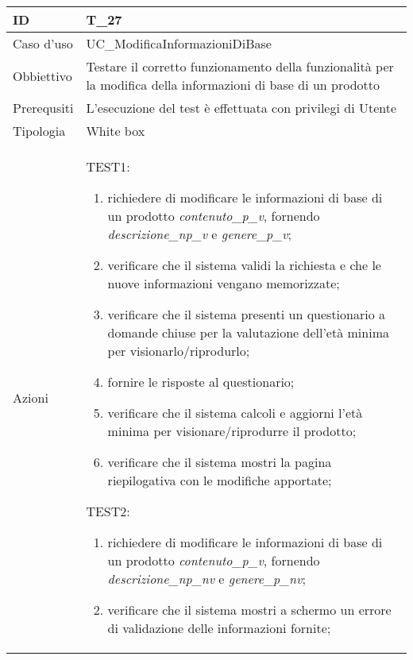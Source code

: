 \begin{table}[hb]
    \centering
    \begin{tabular}{ |p{2cm}|p{10cm}|  }
        \hline
        ID          & T\_27                                                                                                          \\\hline
        Caso d'uso  & UC\_ModificaInformazioniDiBase                                                                                 \\\hline
        Obbiettivo  & Testare il corretto funzionamento della funzionalità per la modifica della informazioni di base di un prodotto \\\hline
        Prerequsiti & L'esecuzione del test è effettuata con privilegi di Utente                                                     \\\hline
        Tipologia   & White box                                                                                                      \\\hline
        Azioni      &
        TEST1:
        \begin{enumerate}[nosep, topsep=0pt]
            \item richiedere di modificare le informazioni di base di un prodotto \emph{contenuto\_p\_v}, fornendo \emph{descrizione\_np\_v} e \emph{genere\_p\_v};
            \item verificare che il sistema validi la richiesta e che le nuove informazioni vengano memorizzate;
            \item verificare che il sistema presenti un questionario a domande chiuse per la valutazione dell'età minima per visionarlo/riprodurlo;
            \item fornire le risposte al questionario;
            \item verificare che il sistema calcoli e aggiorni l'età minima per visionare/riprodurre il prodotto;
            \item verificare che il sistema mostri la pagina riepilogativa con le modifiche apportate;
        \end{enumerate}
        \vspace{0.5cm} TEST2:
        \begin{enumerate}[nosep, topsep=0pt]
            \item richiedere di modificare le informazioni di base di un prodotto \emph{contenuto\_p\_v}, fornendo \emph{descrizione\_np\_nv} e \emph{genere\_p\_nv};
            \item verificare che il sistema mostri a schermo un errore di validazione delle informazioni fornite;
        \end{enumerate}
        \\\hline
    \end{tabular}
\end{table}

